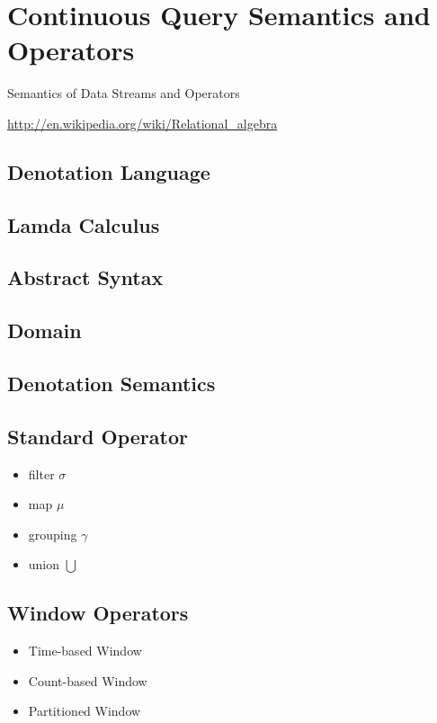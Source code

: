 \section{Continuous Query Semantics and Operators}
Semantics of Data Streams and Operators

\href{http://en.wikipedia.org/wiki/Relational\_algebra}{http://en.wikipedia.org/wiki/Relational\_algebra}
\subsection*{Denotation Language}
\subsection*{Lamda Calculus}

\subsection{Abstract Syntax}


\subsection{Domain}

\subsection{Denotation Semantics}








\subsection{Standard Operator}
\begin{itemize}
	\item filter $\sigma$
	\item map $\mu$
	\item grouping $\gamma$  
	\item union $\bigcup$
\end{itemize}

\subsection{Window Operators}
\begin{itemize}
\item Time-based Window
\item Count-based Window
\item Partitioned Window
\end{itemize}



